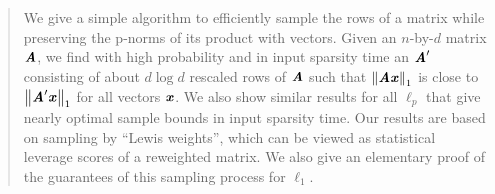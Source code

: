 


\begin{abstract}
We give a simple algorithm to efficiently sample the rows of a matrix while
preserving the p-norms of its product with vectors.
Given an $n$-by-$d$ matrix $\AA$, we find with high probability and in
input sparsity time an $\AA'$ consisting of about $d \log{d}$ rescaled rows of
$\AA$ such that $\norm{\AA \xx}_1$ is close to $\norm{\AA' \xx}_1$ for all vectors $\xx$.
We also show similar results for all $\ell_p$ that give nearly optimal sample bounds 
in input sparsity time.  Our results are based on sampling by ``Lewis weights'',
which can be viewed as statistical leverage scores of a reweighted matrix.
We also give an elementary proof of the guarantees of this sampling process for $\ell_1$.
\end{abstract}

